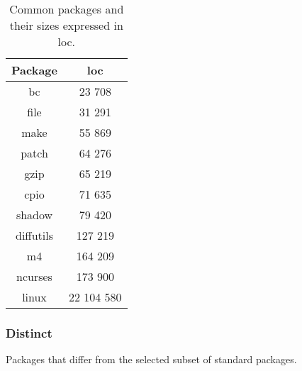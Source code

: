 \begin{table}[!h]
    \centering
    \begin{tabular}{|c||c|}
        \hline
        Package & \gls{loc} \\
        \hline
        \hline
        bc \cite{bc} & 23 708 \\
        \hline        
        file\cite{file} & 31 291 \\
        \hline
        make \cite{make} & 55 869 \\
        \hline
        patch \cite{patch} & 64 276 \\
        \hline
        gzip\cite{gzip} & 65 219 \\
        \hline
        cpio \cite{cpio} & 71 635 \\
        \hline
        shadow\cite{shadow} & 79 420 \\
        \hline
        diffutils \cite{diffutils} & 127 219 \\
        \hline
        m4 \cite{m4} & 164 209 \\
        \hline
        ncurses \cite{ncurses} & 173 900 \\
        \hline
        linux \cite{linux} & 22 104 580 \\
        \hline
    \end{tabular}
    \caption{Common packages and their sizes expressed in \gls{loc}.}
    \label{table:Common packages}
\end{table}

\newpage

\subsubsection{Distinct}

Packages that differ from the selected subset of standard packages.

